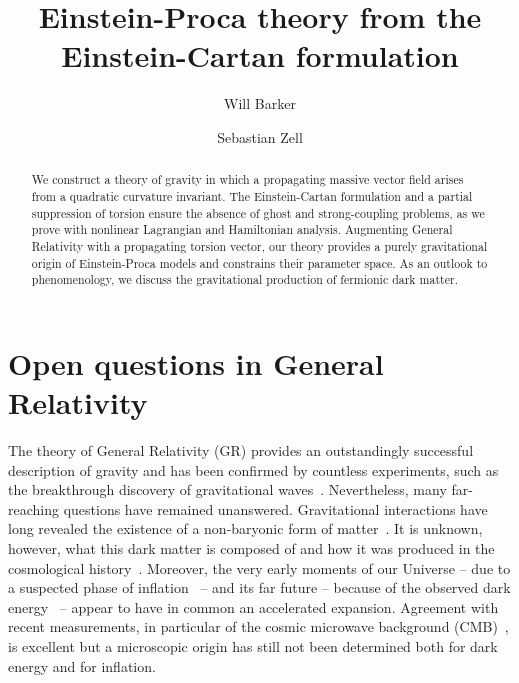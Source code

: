 \documentclass[aps,prd,reprint,preprintnumbers,showpacs,floatfix,nofootinbib,superscript address,longbibliography]{revtex4-1}
\begin{document}
\title{Einstein-Proca theory from the Einstein-Cartan formulation}

\author{Will Barker}
\author{Sebastian Zell}


\begin{abstract}
	We construct a theory of gravity in which a propagating massive vector field arises from a quadratic curvature invariant. 
	The Einstein-Cartan formulation and a partial suppression of torsion ensure the absence of ghost and strong-coupling problems, as we prove with nonlinear Lagrangian and Hamiltonian analysis. Augmenting General Relativity with a propagating torsion vector, our theory provides a purely gravitational origin of Einstein-Proca models and constrains their parameter space. As an outlook to phenomenology, we discuss the gravitational production of fermionic dark matter.
\end{abstract}



\maketitle

\section{Open questions in General Relativity}
The theory of General Relativity (GR) provides an outstandingly successful description of gravity and has been confirmed by countless experiments, such as the breakthrough discovery of gravitational waves~\cite{LIGOScientific:2016aoc}. Nevertheless, many far-reaching questions have remained unanswered. Gravitational interactions have long revealed the existence of a non-baryonic form of matter~\cite{Zwicky:1933gu}. It is unknown, however, what this dark matter is composed of and how it was produced in the cosmological history~\cite{Feng:2010gw,Peebles:2013hla,Bertone:2016nfn,Arbey:2021gdg}. Moreover, the very early moments of our Universe -- due to a suspected phase of inflation~\cite{Starobinsky:1980te, Guth:1980zm, Linde:1981mu, Mukhanov:1981xt} -- and its far future -- because of the observed dark energy~\cite{SupernovaSearchTeam:1998fmf, SupernovaCosmologyProject:1998vns} -- appear to have in common an accelerated expansion. Agreement with recent	measurements, in particular of the cosmic microwave background (CMB)~\cite{Planck:2018jri, BICEP:2021xfz}, is excellent but a microscopic origin has still not been determined both for dark energy and for inflation.
\end{document}
